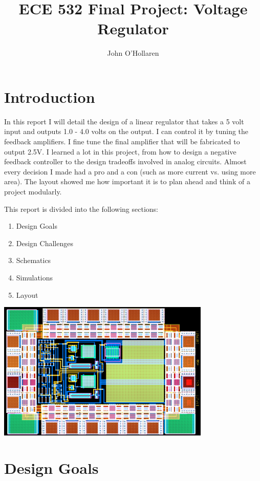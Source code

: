 \documentclass[10pt]{amsart}
\title{ECE 532 Final Project: Voltage Regulator}
\author{John O'Hollaren}
\begin{document}
\maketitle

\section{Introduction}
In this report I will detail the design of a linear regulator that takes a 5 volt input and outputs 1.0 - 4.0 volts on the output. I can control it by tuning the feedback amplifiers. I fine tune the final amplifier that will be fabricated to output 2.5V. I learned a lot in this project, from how to design a negative feedback controller to the design tradeoffs involved in analog circuits. Almost every decision I made had a pro and a con (such as more current vs. using more area). The layout showed me how important it is to plan ahead and think of a project modularly.

This report is divided into the following sections:
\begin{enumerate}
\item Design Goals
\item Design Challenges
\item Schematics
\item Simulations
\item Layout
\end{enumerate}

	\begin{center}
		\includegraphics[width=4in]{Media/full_layout.png}
	\end{center}

\newpage

\section{Design Goals}
\end{document}
